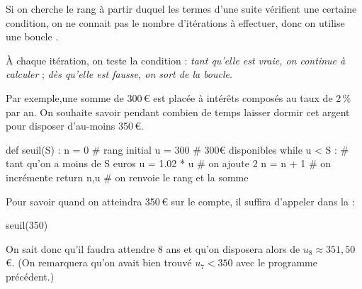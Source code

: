 \documentclass[a4paper,11pt]{article}
\begin{document}
\begin{calgo}
Si on cherche le rang à partir duquel les termes d'une suite vérifient une certaine condition, on ne connait pas le nombre d'itérations à effectuer, donc on utilise une boucle .

À chaque itération, on teste la condition : \textit{tant qu'elle est vraie, on continue à calculer} ; \textit{dès qu'elle est fausse, on sort de la boucle}.

Par exemple,une somme de 300\,€ est placée à intérêts composés au taux de 2\,\% par an. On souhaite savoir pendant combien de temps laisser dormir cet argent pour disposer d'au-moins 350\,€.

\begin{envpython}[15cm]
	def seuil(S) :
		n = 0                   # rang initial
		u = 300                 # 300€ disponibles
		while u < S :           # tant qu'on a moins de S euros
			u = 1.02 * u        # on ajoute 2%
			n = n + 1           # on incrémente
		return n,u              # on renvoie le rang et la somme
\end{envpython}

Pour savoir quand on atteindra 350\,€ sur le compte, il suffira d'appeler dans la  :

\begin{consolepython}[15cm]
\begin{pyconsole}[][framesep=3mm,frame=single,label={[\scriptsize Début de la console \logopython]\scriptsize Fin de la console \logopython},fontsize=\footnotesize,framerule=1pt,rulecolor=\color{ForestGreen}]
seuil(350)
\end{pyconsole}
\end{consolepython}

On sait donc qu'il faudra attendre 8 ans et qu'on disposera alors de $u_8 \approx 351,50$\,€. (On remarquera qu'on avait bien trouvé $u_7<350$ avec le programme précédent.)
\end{calgo}
\end{document}
